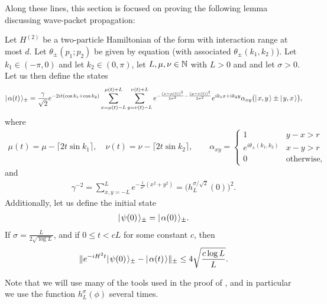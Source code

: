 \documentclass[../thesis-main/thesis-main]{subfiles}
\begin{document}
Along these lines, this section is focused on proving the following lemma discussing wave-packet propagation:
\begin{theorem}
Let $H^{(2)}$ be a two-particle Hamiltonian of the form  with interaction range at most $d$.  Let $\theta_{\pm}(p_1;p_2)$ be given by equation  (with associated $\theta_{\pm}(k_1,k_2)$).  Let $k_1\in (-\pi,0)$ and let $k_2 \in (0,\pi)$, let $L,\mu, \nu \in \mathbb{N}$ with $L>0$ and and let $\sigma > 0$.  Let us then define the states
\begin{align}
  |\mspace{2mu} \alpha(t) \mspace{2mu} \rangle_{\pm} = \frac{\gamma}{\sqrt{2}} e^{-2i t (\cos k_1 + \cos k_2)} \sum_{x = \mu(t)-L}^{\mu(t)+L} \sum_{y = \nu(t) -L}^{\nu(t)+L} e^{ -\frac{ (x-\mu(t))^2}{2\sigma^2} - \frac{(y-\nu(t))^2}{2\sigma^2}} e^{i k_1 x + i k_2 y} \alpha_{xy} \big( |\mspace{2mu} x,y \mspace{2mu} \rangle \pm |\mspace{2mu} y,x \mspace{2mu} \rangle\big),
\end{align}
where
\begin{align}
  \mu(t) = \mu - \lceil 2 t \sin k_1\rceil, \quad
  \nu(t) = \nu - \lceil 2 t \sin k_2\rceil, \qquad
  \alpha_{xy} = \begin{cases} 1  & y-x > r\\
  e^{i\theta_\pm(k_1,k_2)} & x-y > r\\
  0 & \text{otherwise},
  \end{cases}
\end{align}
and
\begin{align}
  \gamma^{-2} = \sum_{x,y=-L}^L e^{-\frac{1}{\sigma^2}(x^2+y^2)} = \Big(h_L^{\sigma/\sqrt{2}}(0)\Big)^2.
\end{align}
Additionally, let us define the initial state
\begin{align}
  |\mspace{2mu} \psi(0) \mspace{2mu} \rangle_{\pm} = |\mspace{2mu} \alpha(0) \mspace{2mu} \rangle_{\pm}.
\end{align}
If $\sigma = \frac{ L}{2\sqrt{\log L}}$, and if $0 \leq t < c L$ for some constant $c$, then 
\begin{align}
  \|{e^{ - i H^2 t} |\mspace{2mu} \psi(0) \mspace{2mu} \rangle_{\pm} - |\mspace{2mu} \alpha(t) \mspace{2mu} \rangle}\|_{\pm} \leq 4 \sqrt{\frac{c\log L}{L}}.
\end{align}
\label{thm:two_particle_wave-packet_bound}
\end{theorem}

Note that we will use many of the tools used in the proof of , and in particular we use the function $h_L^\sigma(\phi)$ several times.
\end{document}
